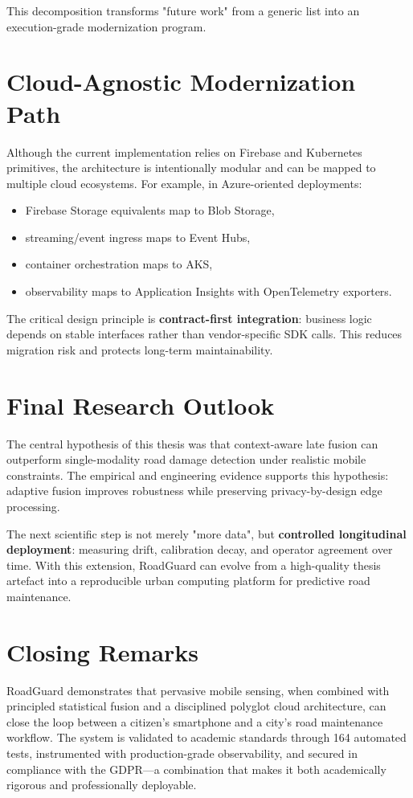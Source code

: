 This decomposition transforms "future work" from a generic list into an execution-grade modernization program.

\section{Cloud-Agnostic Modernization Path}
Although the current implementation relies on Firebase and Kubernetes primitives, the architecture is intentionally modular and can be mapped to multiple cloud ecosystems. For example, in Azure-oriented deployments:
\begin{itemize}
    \item Firebase Storage equivalents map to Blob Storage,
    \item streaming/event ingress maps to Event Hubs,
    \item container orchestration maps to AKS,
    \item observability maps to Application Insights with OpenTelemetry exporters.
\end{itemize}

The critical design principle is \textbf{contract-first integration}: business logic depends on stable interfaces rather than vendor-specific SDK calls. This reduces migration risk and protects long-term maintainability.

\section{Final Research Outlook}
The central hypothesis of this thesis was that context-aware late fusion can outperform single-modality road damage detection under realistic mobile constraints. The empirical and engineering evidence supports this hypothesis: adaptive fusion improves robustness while preserving privacy-by-design edge processing.

The next scientific step is not merely "more data", but \textbf{controlled longitudinal deployment}: measuring drift, calibration decay, and operator agreement over time. With this extension, RoadGuard can evolve from a high-quality thesis artefact into a reproducible urban computing platform for predictive road maintenance.

\section{Closing Remarks}

RoadGuard demonstrates that pervasive mobile sensing, when combined with
principled statistical fusion and a disciplined polyglot cloud architecture,
can close the loop between a citizen's smartphone and a city's road maintenance
workflow. The system is validated to academic standards through 164 automated
tests, instrumented with production-grade observability, and secured in
compliance with the GDPR---a combination that makes it both academically
rigorous and professionally deployable.
